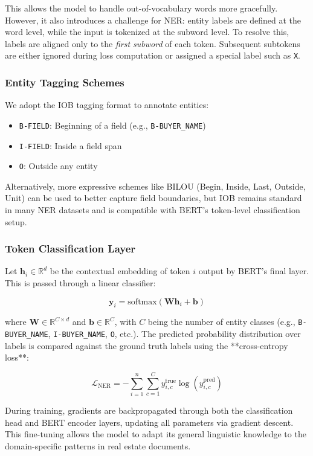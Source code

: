 \documentclass{article}
\begin{document}
This allows the model to handle out-of-vocabulary words more gracefully. However, it also introduces a challenge for NER: entity labels are defined at the word level, while the input is tokenized at the subword level. To resolve this, labels are aligned only to the \emph{first subword} of each token. Subsequent subtokens are either ignored during loss computation or assigned a special label such as \texttt{X}.

\subsubsection{Entity Tagging Schemes}

We adopt the IOB tagging format to annotate entities:
\begin{itemize}
    \item \texttt{B-FIELD}: Beginning of a field (e.g., \texttt{B-BUYER\_NAME})
    \item \texttt{I-FIELD}: Inside a field span
    \item \texttt{O}: Outside any entity
\end{itemize}

Alternatively, more expressive schemes like BILOU (Begin, Inside, Last, Outside, Unit) can be used to better capture field boundaries, but IOB remains standard in many NER datasets and is compatible with BERT’s token-level classification setup.

\subsubsection{Token Classification Layer}

Let $\mathbf{h}_i \in \mathbb{R}^d$ be the contextual embedding of token $i$ output by BERT's final layer. This is passed through a linear classifier:

\[
\mathbf{y}_i = \text{softmax}(\mathbf{W} \mathbf{h}_i + \mathbf{b})
\]

where $\mathbf{W} \in \mathbb{R}^{C \times d}$ and $\mathbf{b} \in \mathbb{R}^C$, with $C$ being the number of entity classes (e.g., \texttt{B-BUYER\_NAME}, \texttt{I-BUYER\_NAME}, \texttt{O}, etc.). The predicted probability distribution over labels is compared against the ground truth labels using the **cross-entropy loss**:

\[
\mathcal{L}_{\text{NER}} = -\sum_{i=1}^{n} \sum_{c=1}^{C} y_{i,c}^{\text{true}} \log(y_{i,c}^{\text{pred}})
\]

During training, gradients are backpropagated through both the classification head and BERT encoder layers, updating all parameters via gradient descent. This fine-tuning allows the model to adapt its general linguistic knowledge to the domain-specific patterns in real estate documents.
\end{document}

